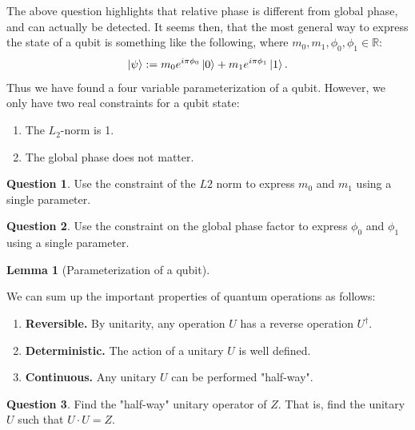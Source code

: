 \documentclass[letterpaper, 12pt]{article}
\newcommand{\R}{\mathbb{R}}	%
\newcommand{\1}{\mathds{1}}	%
\theoremstyle{definition}
\newtheorem{lemma}[theorem]{Lemma}
\newtheorem{question}{Question}
\begin{document}
The above question highlights that relative phase is different from global phase, and can actually be detected. It seems then, that the most general way to express the state of a qubit is something like the following, where $m_0, m_1, \phi_0, \phi_1 \in \R$: 
\begin{equation}
    \ket{\psi} := m_0 e^{i\pi \phi_0} \ket{0} + m_1 e^{i\pi \phi_1} \ket{1}.
\end{equation}
Thus we have found a four variable parameterization of a qubit. However, we only have two real constraints for a qubit state: 
\begin{enumerate}
    \item The $L_2$-norm is 1. 
    \item The global phase does not matter. 
\end{enumerate}

\begin{question}
    Use the constraint of the $L2$ norm to express $m_0$ and $m_1$ using a single parameter. 
\end{question}
\vspace{25mm}

\begin{question}
    Use the constraint on the global phase factor to express $\phi_0$ and $\phi_1$ using a single parameter.
\end{question}
\vspace{25mm}

\begin{lemma}[Parameterization of a qubit]
    
\end{lemma}
\vspace{20mm}

We can sum up the important properties of quantum operations as follows: 
\begin{enumerate}
    \item \textbf{Reversible.} By unitarity, any operation $U$ has a reverse operation $U^\dagger$.
    \item \textbf{Deterministic.} The action of a unitary $U$ is well defined.
    \item \textbf{Continuous.} Any unitary $U$ can be performed "half-way". 
\end{enumerate}

\begin{question}
    Find the "half-way" unitary operator of $Z$. That is, find the unitary $U$ such that $U\cdot U = Z$. 
\end{question}
\end{document}
